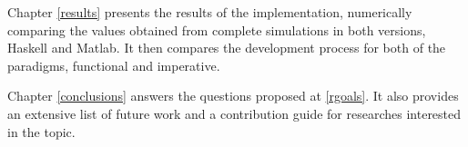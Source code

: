 Chapter \ref{results} presents the results of the implementation, numerically comparing the values obtained from complete simulations in both versions, Haskell and Matlab. It then compares the development process for both of the paradigms, functional and imperative.

Chapter \ref{conclusions} answers the questions proposed at \ref{rgoals}. It also provides an extensive list of future work and a contribution guide for researches interested in the topic.
 







